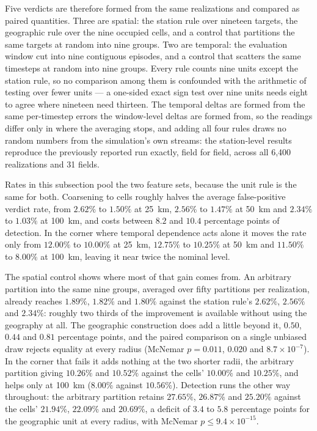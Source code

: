 Five verdicts are therefore formed from the same realizations and compared as paired quantities.
Three are spatial: the station rule over nineteen targets, the geographic rule over the nine
occupied cells, and a control that partitions the same targets at random into nine groups. Two are
temporal: the evaluation window cut into nine contiguous episodes, and a control that scatters the
same timesteps at random into nine groups. Every rule counts nine units except the station rule,
so no comparison among them is confounded with the arithmetic of testing over fewer units --- a
one-sided exact sign test over nine units needs eight to agree where nineteen need thirteen. The
temporal deltas are formed from the same per-timestep errors the window-level deltas are formed
from, so the readings differ only in where the averaging stops, and adding all four rules draws no
random numbers from the simulation's own streams: the station-level results reproduce the
previously reported run exactly, field for field, across all 6{,}400 realizations and 31 fields.

Rates in this subsection pool the two feature sets, because the unit rule is the same for both.
Coarsening to cells roughly halves the average false-positive verdict rate, from $2.62\%$ to
$1.50\%$ at 25~km, $2.56\%$ to $1.47\%$ at 50~km and $2.34\%$ to $1.03\%$ at 100~km, and costs
between $8.2$ and $10.4$ percentage points of detection. In the corner where temporal dependence
acts alone it moves the rate only from $12.00\%$ to $10.00\%$ at 25~km, $12.75\%$ to $10.25\%$ at
50~km and $11.50\%$ to $8.00\%$ at 100~km, leaving it near twice the nominal level.

The spatial control shows where most of that gain comes from. An arbitrary partition into the same
nine groups, averaged over fifty partitions per realization, already reaches $1.89\%$, $1.82\%$ and
$1.80\%$ against the station rule's $2.62\%$, $2.56\%$ and $2.34\%$: roughly two thirds of the
improvement is available without using the geography at all. The geographic construction does add
a little beyond it, $0.50$, $0.44$ and $0.81$ percentage points, and the paired comparison on a
single unbiased draw rejects equality at every radius (McNemar $p=0.011$, $0.020$ and
$8.7\times10^{-7}$). In the corner that fails it adds nothing at the two shorter radii, the
arbitrary partition giving $10.26\%$ and $10.52\%$ against the cells' $10.00\%$ and $10.25\%$, and
helps only at 100~km ($8.00\%$ against $10.56\%$). Detection runs the other way throughout: the
arbitrary partition retains $27.65\%$, $26.87\%$ and $25.20\%$ against the cells' $21.94\%$,
$22.09\%$ and $20.69\%$, a deficit of $3.4$ to $5.8$ percentage points for the geographic unit at
every radius, with McNemar $p\le9.4\times10^{-15}$.

